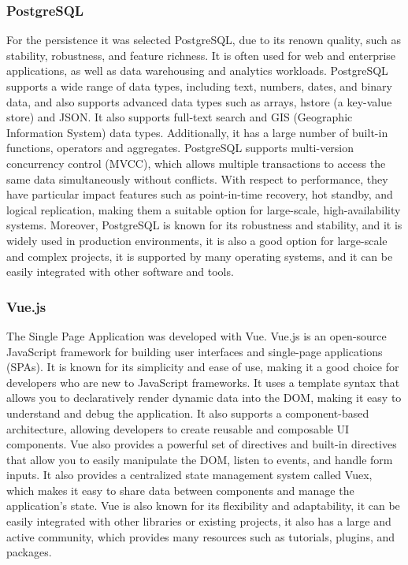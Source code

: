 \subsubsection{PostgreSQL}
For the persistence it was selected PostgreSQL, due to its renown quality, such as stability, robustness, and feature richness. It is often used for web and enterprise applications, as well as data warehousing and analytics workloads. PostgreSQL supports a wide range of data types, including text, numbers, dates, and binary data, and also supports advanced data types such as arrays, hstore (a key-value store) and JSON. It also supports full-text search and GIS (Geographic Information System) data types. Additionally, it has a large number of built-in functions, operators and aggregates. PostgreSQL supports multi-version concurrency control (MVCC), which allows multiple transactions to access the same data simultaneously without conflicts. With respect to performance, they have particular impact features such as point-in-time recovery, hot standby, and logical replication, making them a suitable option for large-scale, high-availability systems. Moreover, PostgreSQL is known for its robustness and stability, and it is widely used in production environments, it is also a good option for large-scale and complex projects, it is supported by many operating systems, and it can be easily integrated with other software and tools.

\subsubsection{Vue.js}
The Single Page Application was developed with Vue. Vue.js is an open-source JavaScript framework for building user interfaces and single-page applications (SPAs). It is known for its simplicity and ease of use, making it a good choice for developers who are new to JavaScript frameworks. It uses a template syntax that allows you to declaratively render dynamic data into the DOM, making it easy to understand and debug the application. It also supports a component-based architecture, allowing developers to create reusable and composable UI components. Vue also provides a powerful set of directives and built-in directives that allow you to easily manipulate the DOM, listen to events, and handle form inputs. It also provides a centralized state management system called Vuex, which makes it easy to share data between components and manage the application's state. Vue is also known for its flexibility and adaptability, it can be easily integrated with other libraries or existing projects, it also has a large and active community, which provides many resources such as tutorials, plugins, and packages.